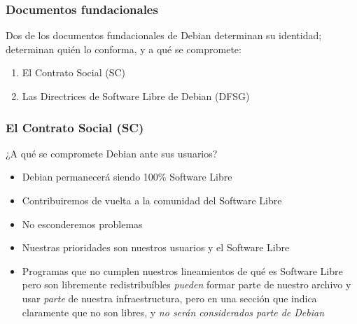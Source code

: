 \documentclass{beamer}
\begin{document}
\begin{frame}
  \frametitle {Documentos fundacionales}
  \begin{center}
    Dos de los documentos fundacionales de Debian determinan su
    identidad; determinan quién lo conforma, y a qué se compromete:
  \end{center}
  \begin{enumerate}
  \item El Contrato Social (SC)
  \item Las Directrices de Software Libre de Debian (DFSG)
  \end{enumerate}
\end{frame}
\begin{frame}
  \frametitle {El Contrato Social (SC)}
  \begin{center}
    ¿A qué se compromete Debian ante sus usuarios?
  \end{center}
  \begin{itemize}
    \item Debian permanecerá siendo 100\% Software Libre 
    \item Contribuiremos de vuelta a la comunidad del Software Libre
    \item No esconderemos problemas
    \item Nuestras prioridades son nuestros usuarios y el Software Libre 
    \item Programas que no cumplen nuestros lineamientos de qué es
      Software Libre pero son libremente redistribuíbles {\em pueden}
      formar parte de nuestro archivo y usar {\em parte} de nuestra
      infraestructura, pero en una sección que indica claramente que
      no son libres, y {\em no serán considerados parte de Debian}
  \end{itemize}
\end{frame}
\end{document}
